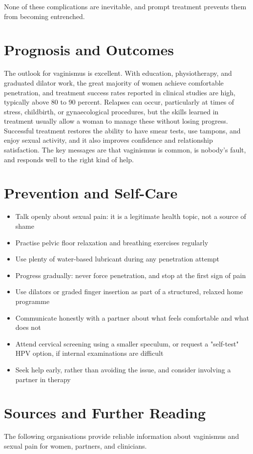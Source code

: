 None of these complications are inevitable, and prompt treatment prevents them from becoming entrenched.

\section*{Prognosis and Outcomes}
The outlook for vaginismus is excellent. With education, physiotherapy, and graduated dilator work, the great majority of women achieve comfortable penetration, and treatment success rates reported in clinical studies are high, typically above 80 to 90 percent. Relapses can occur, particularly at times of stress, childbirth, or gynaecological procedures, but the skills learned in treatment usually allow a woman to manage these without losing progress. Successful treatment restores the ability to have smear tests, use tampons, and enjoy sexual activity, and it also improves confidence and relationship satisfaction. The key messages are that vaginismus is common, is nobody's fault, and responds well to the right kind of help.

\section*{Prevention and Self-Care}
\begin{itemize}
    \item Talk openly about sexual pain: it is a legitimate health topic, not a source of shame
    \item Practise pelvic floor relaxation and breathing exercises regularly
    \item Use plenty of water-based lubricant during any penetration attempt
    \item Progress gradually: never force penetration, and stop at the first sign of pain
    \item Use dilators or graded finger insertion as part of a structured, relaxed home programme
    \item Communicate honestly with a partner about what feels comfortable and what does not
    \item Attend cervical screening using a smaller speculum, or request a "self-test" HPV option, if internal examinations are difficult
    \item Seek help early, rather than avoiding the issue, and consider involving a partner in therapy
\end{itemize}

\section*{Sources and Further Reading}
The following organisations provide reliable information about vaginismus and sexual pain for women, partners, and clinicians.

